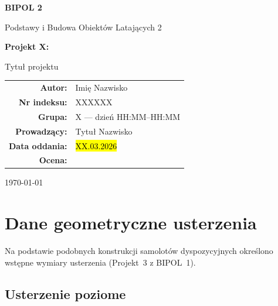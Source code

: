 \documentclass[12pt, a4paper]{article}
\newcommand{\imienazwisko}{Imię Nazwisko}
\newcommand{\nrindeksu}{XXXXXX}
\newcommand{\grupa}{X — dzień HH:MM–HH:MM}
\newcommand{\prowadzacy}{Tytuł Nazwisko}
\newcommand{\nrprojektu}{X}
\newcommand{\tytulprojektu}{Tytuł projektu}
\newcommand{\dataoddania}{\hl{XX.03.2026}}
\begin{document}
\begin{titlepage}
  \centering
  \vspace*{1.5cm}

  {\LARGE\bfseries BIPOL 2 \par}
  \vspace{0.4cm}
  {\large Podstawy i Budowa Obiektów Latających 2 \par}
  \vspace{1.5cm}

  {\Large\bfseries Projekt \nrprojektu: \par}
  \vspace{0.4cm}
  {\Large \tytulprojektu \par}
  \vspace{2.5cm}

  \begin{tabular}{rl}
    \textbf{Autor:}        & \imienazwisko \\[4pt]
    \textbf{Nr indeksu:}   & \nrindeksu    \\[4pt]
    \textbf{Grupa:}        & \grupa        \\[4pt]
    \textbf{Prowadzący:}   & \prowadzacy   \\[10pt]
    \textbf{Data oddania:} & \dataoddania  \\[10pt]
    \textbf{Ocena:}        & \dotfill      \\
  \end{tabular}

  \vfill
  \today
\end{titlepage}

\tableofcontents
\newpage

\section{Dane geometryczne usterzenia}

Na podstawie podobnych konstrukcji samolotów dyspozycyjnych określono wstępne wymiary
usterzenia (Projekt~3 z BIPOL~1).

\subsection{Usterzenie poziome}
\end{document}
